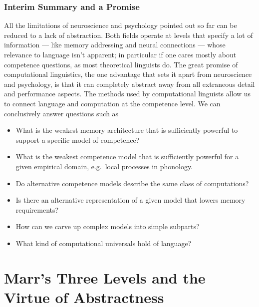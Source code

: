 \subsubsection{Interim Summary and a Promise}

All the limitations of neuroscience and psychology pointed out so far can be reduced to a lack of abstraction.
Both fields operate at levels that specify a lot of information --- like memory addressing and neural connections --- whose relevance to language isn't apparent; in particular if one cares mostly about competence questions, as most theoretical linguists do.
The great promise of computational linguistics, the one advantage that sets it apart from neuroscience and psychology, is that it can completely abstract away from all extraneous detail and performance aspects.
The methods used by computational linguists allow us to connect language and computation at the competence level. 
We can conclusively answer questions such as
%
\begin{itemize}
    \item What is the weakest memory architecture that is sufficiently powerful to support a specific model of competence?
    \item What is the weakest competence model that is sufficiently powerful for a given empirical domain, e.g.\ local processes in phonology.
    \item Do alternative competence models describe the same class of computations?
    \item Is there an alternative representation of a given model that lowers memory requirements?
    \item How can we carve up complex models into simple subparts? 
    \item What kind of computational universals hold of language?
\end{itemize}


\section{Marr's Three Levels and the Virtue of Abstractness}

